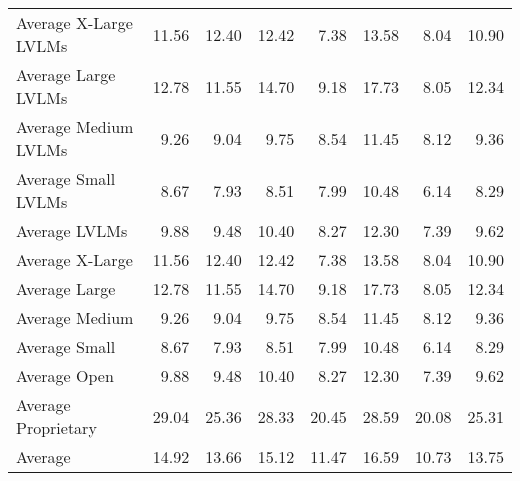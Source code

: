 \begin{tabular}{lrrrrrrr}
\midrule
Average X-Large LVLMs & 11.56 & 12.40 & 12.42 & 7.38 & 13.58 & 8.04 & 10.90 \\
\rowcolor{gray!20}
Average Large LVLMs & 12.78 & 11.55 & 14.70 & 9.18 & 17.73 & 8.05 & 12.34 \\
Average Medium LVLMs & 9.26 & 9.04 & 9.75 & 8.54 & 11.45 & 8.12 & 9.36 \\
\rowcolor{gray!20}
Average Small LVLMs & 8.67 & 7.93 & 8.51 & 7.99 & 10.48 & 6.14 & 8.29 \\
Average LVLMs & 9.88 & 9.48 & 10.40 & 8.27 & 12.30 & 7.39 & 9.62 \\
\rowcolor{gray!20}
Average X-Large & 11.56 & 12.40 & 12.42 & 7.38 & 13.58 & 8.04 & 10.90 \\
Average Large & 12.78 & 11.55 & 14.70 & 9.18 & 17.73 & 8.05 & 12.34 \\
\rowcolor{gray!20}
Average Medium & 9.26 & 9.04 & 9.75 & 8.54 & 11.45 & 8.12 & 9.36 \\
Average Small & 8.67 & 7.93 & 8.51 & 7.99 & 10.48 & 6.14 & 8.29 \\
\rowcolor{gray!20}
Average Open & 9.88 & 9.48 & 10.40 & 8.27 & 12.30 & 7.39 & 9.62 \\
Average Proprietary & 29.04 & 25.36 & 28.33 & 20.45 & 28.59 & 20.08 & 25.31 \\
\rowcolor{gray!20}
Average & 14.92 & 13.66 & 15.12 & 11.47 & 16.59 & 10.73 & 13.75 \\
\bottomrule
\end{tabular}